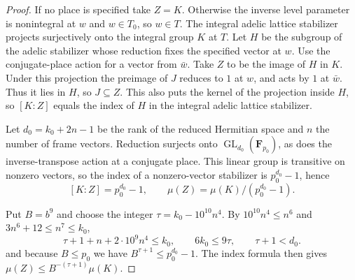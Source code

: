 \begin{proof}
If no place is specified take $Z=K$.
Otherwise the inverse level parameter is nonintegral at $w$ and $w\in T_0$, so $w\in T$.
The integral adelic lattice stabilizer projects surjectively onto the integral group $K$ at $T$.
Let $H$ be the subgroup of the adelic stabilizer whose reduction fixes the specified vector at $w$.
Use the conjugate-place action for a vector from $\bar w$. Take $Z$ to be the image of $H$ in $K$.
Under this projection the preimage of $J$ reduces to $1$ at $w$,
and acts by $1$ at $\bar w$. Thus it lies in $H$, so $J\subseteq Z$.
This also puts the kernel of the projection inside $H$,
so $[K:Z]$ equals the index of $H$ in the integral adelic lattice stabilizer.

Let $d_0=k_0+2n-1$ be the rank of the reduced Hermitian space and $n$ the number of frame vectors.
Reduction surjects onto $\operatorname{GL}_{d_0}(\mathbf F_{p_0})$,
as does the inverse-transpose action at a conjugate place.
This linear group is transitive on nonzero vectors, so the index of a nonzero-vector stabilizer is
$p_0^{d_0}-1$, hence
\[
 [K:Z]=p_0^{d_0}-1,\qquad
 \mu(Z)=\mu(K)/(p_0^{d_0}-1).
\]

Put $B=b^9$ and choose the integer $\tau=k_0-10^{10}n^4$.
By $10^{10}n^4\le n^6$ and $3n^6+12\le n^7\le k_0$,
\[
 \tau+1+n+2\cdot10^9n^4\le k_0,\qquad
 6k_0\le9\tau,\qquad \tau+1<d_0 .
\]
and because $B\le p_0$ we have $B^{\tau+1}\le p_0^{d_0}-1$.
The index formula then gives $\mu(Z)\le B^{-(\tau+1)}\mu(K)$.


\end{proof}
